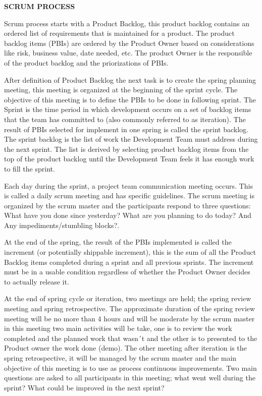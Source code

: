 \documentclass{template/openetcs_article}
\begin{document}
\textbf{SCRUM PROCESS}

Scrum process starts with a Product Backlog, this product backlog contains an ordered list of requirements that is maintained for a product. The product backlog items (PBIs) are ordered by the Product Owner based on considerations like risk, business value, date needed, etc. The product Owner is the responsible of the product backlog and the priorizations of PBIs.

After definition of Product Backlog the next task is to create the spring planning meeting, this meeting is organized at the beginning of the sprint cycle. The objective of this meeting is to define the PBIs to be done in following sprint. The Sprint is the time period in which development occurs on a set of backlog items that the team has committed to (also commonly referred to as iteration). 
The result of PBIs selected for implement in one spring is called the sprint backlog. The sprint backlog is the list of work the Development Team must address during the next sprint. The list is derived by selecting product backlog items from the top of the product backlog until the Development Team feels it has enough work to fill the sprint.

Each day during the sprint, a project team communication meeting occurs. This is called a daily scrum meeting and has specific guidelines. The scrum meeting is organized by the scrum master and the participants respond to three questions: What have you done since yesterday? What are you planning to do today? And Any impediments/stumbling blocks?.

At the end of the spring, the result of the PBIs implemented is called the increment (or potentially shippable increment), this is the sum of all the Product Backlog items completed during a sprint and all previous sprints. The increment must be in a usable condition regardless of whether the Product Owner decides to actually release it.

At the end of spring cycle or iteration, two meetings are held; the spring review meeting and spring retrospective. The approximate duration of the spring review meeting will be no more than 4 hours and will be moderate by the scrum master in this meeting two main activities will be take, one is to review the work completed and the planned work that wasn´t and the other is to presented to the Product owner the work done (demo). The other meeting after iteration is the spring retrospective, it will be managed by the scrum master and the main objective of this meeting is to use as process continuous improvements. Two main questions are asked to all participants in this meeting; what went well during the sprint? What could be improved in the next sprint?
\end{document}
